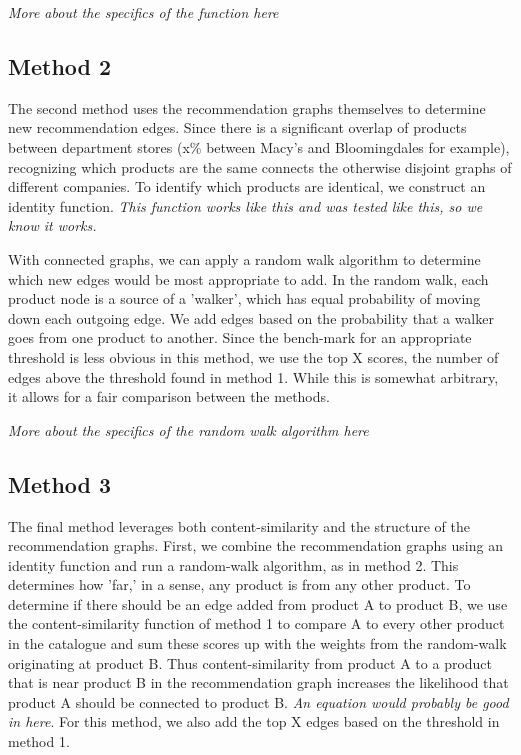 \documentclass[10pt]{article}
\begin{document}
\emph{More about the specifics of the function here}

\subsection*{Method 2}
The second method uses the recommendation graphs themselves to determine new
recommendation edges. Since there is a significant overlap of products between
department stores (x\% between Macy's and Bloomingdales for example),
recognizing which products are the same connects the otherwise disjoint graphs
of different companies. To identify which products are identical, we construct
an identity function. \emph{This function works like this and was tested like
this, so we know it works.}

With connected graphs, we can apply a random walk algorithm to determine which
new edges would be most appropriate to add. In the random walk, each product
node is a source of a 'walker', which has equal probability of moving down each
outgoing edge. We add edges based on the probability that a walker goes from
one product to another. Since the bench-mark for an appropriate threshold is
less obvious in this method, we use the top X scores, the number of edges above
the threshold found in method 1. While this is somewhat arbitrary, it allows
for a fair comparison between the methods.

\emph{More about the specifics of the random walk algorithm here}

\subsection*{Method 3}
The final method leverages both content-similarity and the structure of the
recommendation graphs. First, we combine the recommendation graphs using an
identity function and run a random-walk algorithm, as in method 2. This
determines how 'far,' in a sense, any product is from any other product. To
determine if there should be an edge added from product A to product B, we use
the content-similarity function of method 1 to compare A to every other product
in the catalogue and sum these scores up with the weights from the random-walk
originating at product B. Thus content-similarity from product A to a product
that is near product B in the recommendation graph increases the likelihood
that product A should be connected to product B. \emph{An equation would
probably be good in here}. For this method, we also add the top X edges based
on the threshold in method 1.
\end{document}

